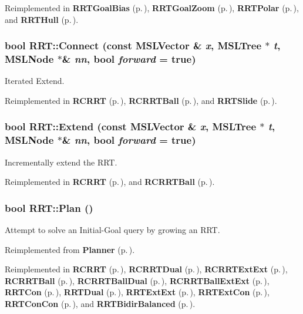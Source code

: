 Reimplemented in {\bf RRTGoal\-Bias} {\rm (p.\,\pageref{classRRTGoalBias_b0})}, {\bf RRTGoal\-Zoom} {\rm (p.\,\pageref{classRRTGoalZoom_b0})}, {\bf RRTPolar} {\rm (p.\,\pageref{classRRTPolar_b0})}, and {\bf RRTHull} {\rm (p.\,\pageref{classRRTHull_b0})}.
\subsubsection{\setlength{\rightskip}{0pt plus 5cm}bool RRT::Connect (const {\bf MSLVector} \& {\em x}, {\bf MSLTree} $\ast$ {\em t}, {\bf MSLNode} $\ast$\& {\em nn}, bool {\em forward} = true)\hspace{0.3cm}{\tt  [protected, virtual]}}\label{classRRT_b3}


Iterated Extend.



Reimplemented in {\bf RCRRT} {\rm (p.\,\pageref{classRCRRT_a9})}, {\bf RCRRTBall} {\rm (p.\,\pageref{classRCRRTBall_a4})}, and {\bf RRTSlide} {\rm (p.\,\pageref{classRRTSlide_a3})}.
\subsubsection{\setlength{\rightskip}{0pt plus 5cm}bool RRT::Extend (const {\bf MSLVector} \& {\em x}, {\bf MSLTree} $\ast$ {\em t}, {\bf MSLNode} $\ast$\& {\em nn}, bool {\em forward} = true)\hspace{0.3cm}{\tt  [protected, virtual]}}\label{classRRT_b2}


Incrementally extend the RRT.



Reimplemented in {\bf RCRRT} {\rm (p.\,\pageref{classRCRRT_a7})}, and {\bf RCRRTBall} {\rm (p.\,\pageref{classRCRRTBall_a3})}.
\subsubsection{\setlength{\rightskip}{0pt plus 5cm}bool RRT::Plan ()\hspace{0.3cm}{\tt  [virtual]}}\label{classRRT_a3}


Attempt to solve an Initial-Goal query by growing an RRT.



Reimplemented from {\bf Planner} {\rm (p.\,\pageref{classPlanner_a4})}.

Reimplemented in {\bf RCRRT} {\rm (p.\,\pageref{classRCRRT_a10})}, {\bf RCRRTDual} {\rm (p.\,\pageref{classRCRRTDual_a2})}, {\bf RCRRTExt\-Ext} {\rm (p.\,\pageref{classRCRRTExtExt_a2})}, {\bf RCRRTBall} {\rm (p.\,\pageref{classRCRRTBall_a5})}, {\bf RCRRTBall\-Dual} {\rm (p.\,\pageref{classRCRRTBallDual_a2})}, {\bf RCRRTBall\-Ext\-Ext} {\rm (p.\,\pageref{classRCRRTBallExtExt_a2})}, {\bf RRTCon} {\rm (p.\,\pageref{classRRTCon_a2})}, {\bf RRTDual} {\rm (p.\,\pageref{classRRTDual_a2})}, {\bf RRTExt\-Ext} {\rm (p.\,\pageref{classRRTExtExt_a2})}, {\bf RRTExt\-Con} {\rm (p.\,\pageref{classRRTExtCon_a2})}, {\bf RRTCon\-Con} {\rm (p.\,\pageref{classRRTConCon_a2})}, and {\bf RRTBidir\-Balanced} {\rm (p.\,\pageref{classRRTBidirBalanced_a2})}.
